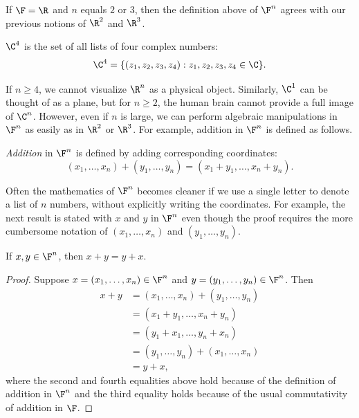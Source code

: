 If $\F=\R$ and $n$ equals $2$ or $3$, then the definition above of $\F^n$
agrees with our previous notions of $\R^2$ and $\R^3$.

\begin{example}[$\C^4$]\label{ax:1.12}
$\C^4$ is the set of all lists of four complex numbers:
\[ \C^4 = \{(z_1,z_2,z_3,z_4) : z_1,z_2,z_3,z_4\in\C\}. \]
\end{example}

%
If $n\ge4$, we cannot visualize $\R^n$ as a physical object. Similarly, $\C^1$
can be thought of as a plane, but for $n\ge2$, the human brain cannot provide a
full image of $\C^n$. However, even if $n$ is large, we can perform algebraic
manipulations in $\F^n$ as easily as in $\R^2$ or $\R^3$. For example, addition
in $\F^n$ is defined as follows.

\begin{definition}[Addition in $\F^n$]\label{ax:1.13}
\emph{Addition} in $\F^n$ is defined by adding corresponding coordinates:
\[ (x_1,\dots,x_n)+(y_1,\dots,y_n) = (x_1+y_1,\dots,x_n+y_n). \]
\end{definition}

Often the mathematics of $\F^n$ becomes cleaner if we use a single letter to
denote a list of $n$ numbers, without explicitly writing the coordinates. For
example, the next result is stated with $x$ and $y$ in $\F^n$ even though the
proof requires the more cumbersome notation of $(x_1,\dots,x_n)$ and
$(y_1,\dots,y_n)$.

\begin{result}\label{ax:1.14}
If $x,y\in\F^n$, then $x+y=y+x$.
\end{result}

\begin{proof}
Suppose $x=(x_1,\dots,x_n)\in\F^n$ and $y=(y_1,\dots,y_n)\in\F^n$. Then
\begin{align*}
x+y &= (x_1,\dots,x_n)+(y_1,\dots,y_n)\\
    &= (x_1+y_1,\dots,x_n+y_n)\\
    &= (y_1+x_1,\dots,y_n+x_n)\\
    &= (y_1,\dots,y_n)+(x_1,\dots,x_n)\\
    &= y+x,
\end{align*}
where the second and fourth equalities above hold because of the definition of
addition in $\F^n$ and the third equality holds because of the usual
commutativity of addition in $\F$.
\end{proof}

